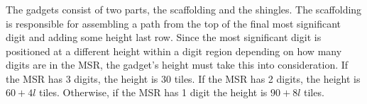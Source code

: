 \subsubsection{\roofunit}
%
The {\roofunit} gadgets consist of two parts, the scaffolding and the shingles.
%
The scaffolding is responsible for assembling a path from the top of the final most significant digit and adding some height last row.
%
Since the most significant digit is positioned at a different height within a digit region depending on how many digits
are in the MSR, the {\roofscaffolding} gadget's height must take this into consideration.
%
If the MSR has 3 digits, the height is $30$ tiles.
%
If the MSR has 2 digits, the height is $60 + 4l$ tiles.
%
Otherwise, if the MSR has 1 digit the height is $90 + 8l$ tiles.
%



